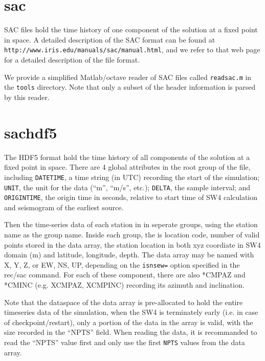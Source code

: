 \documentclass[11pt]{report}
\begin{document}
\section{sac}\label{sec:sac-format}

SAC files hold the time history of one component of the solution at a fixed point in space.  A
detailed description of the SAC format can be found at {\tt
http://www.iris.edu/manuals/sac/manual.html}, and we refer to that web page for a detailed
description of the file format.

We provide a simplified Matlab/octave reader of SAC files called {\tt readsac.m} in the {\tt tools}
directory. Note that only a subset of the header information is parsed by this reader.

\section{sachdf5}\label{sec:sachdf5-format}

The HDF5 format hold the time history of all components of the solution at a fixed point in space.
There are 4 global attributes in the root group of the file, including {\tt DATETIME}, a time string
(in UTC) recording the start of the simulation; {\tt UNIT}, the unit for the data (``m'', ``m/s'', etc.);
{\tt DELTA}, the sample interval; and {\tt ORIGINTIME}, the origin time in seconds, relative to start time 
of SW4 calculation and seismogram of the earliest source.

Then the time-series data of each station in in seperate groups, using the station name as the group name.
Inside each group, the is location code, number of valid points stored in the data array, the station location
in both xyz coordiate in SW4 domain (m) and latitude, longitude, depth. The data array may be named with 
X, Y, Z, or EW, NS, UP, depending on the {\tt isnsew=} option specified in the rec/sac command. For each of 
these component, there are also *CMPAZ and *CMINC (e.g. XCMPAZ, XCMPINC) recording its azimuth and inclination.

Note that the dataspace of the data array is pre-allocated to hold the entire timeseries data of the simulation,
when the SW4 is terminately early (i.e. in case of checkpoint/restart), only a portion of the data in the array
is valid, with the size recorded in the ``NPTS'' field. When reading the data, it is recommanded to read the 
``NPTS'' value first and only use the first {\tt NPTS} values from the data array.
\end{document}
